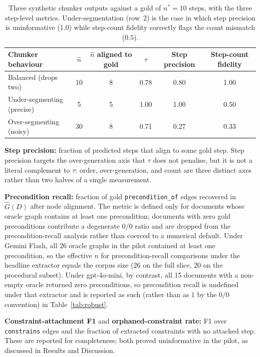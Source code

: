 \documentclass[make,article,submit,oneauthor,pdftex]{Definitions/mdpi}
\begin{document}
\begin{table}[ht]
\centering
\caption{Three synthetic chunker outputs against a gold of $n^{*}=10$
steps, with the three step-level metrics. Under-segmentation
(row~2) is the case in which step precision is uninformative ($1.0$)
while step-count fidelity correctly flags the count mismatch ($0.5$).}
\label{tab:metric-comparison}
\small
\begin{tabular}{lccccc}
\toprule
Chunker behaviour & $\hat{n}$ & $\hat{n}$ aligned to gold &
$\tau$ & Step precision & Step-count fidelity \\
\midrule
Balanced (drops two)        & 10 & 8 & 0.78 & 0.80 & 1.00 \\
Under-segmenting (precise)  &  5 & 5 & 1.00 & 1.00 & 0.50 \\
Over-segmenting (noisy)     & 30 & 8 & 0.71 & 0.27 & 0.33 \\
\bottomrule
\end{tabular}
\end{table}

\textbf{Step precision:} fraction of predicted steps that align to
some gold step. Step precision targets the over-generation axis that
$\tau$ does not penalise, but it is not a literal complement to
$\tau$: order, over-generation, and count are three distinct axes
rather than two halves of a single measurement.

\textbf{Precondition recall:} fraction of gold
\texttt{precondition\_of} edges recovered in $\hat{G}(D)$ after node
alignment. The metric is defined only for documents whose oracle graph
contains at least one precondition; documents with zero gold
preconditions contribute a degenerate $0/0$ ratio and are dropped from
the precondition-recall analysis rather than coerced to a numerical
default. Under Gemini Flash, all 26 oracle graphs in the pilot
contained at least one precondition, so the effective $n$ for
precondition-recall comparisons under the headline extractor equals
the corpus size (26 on the full slice, 20 on the procedural subset).
Under gpt-4o-mini, by contrast, all 15 documents with a non-empty
oracle returned zero preconditions, so precondition recall is
undefined under that extractor and is reported as such (rather than as
$1$ by the $0/0$ convention) in Table~\ref{tab:robust}.

\textbf{Constraint-attachment F1} and \textbf{orphaned-constraint
rate:} F1 over \texttt{constrains} edges and the fraction of extracted
constraints with no attached step. These are reported for
completeness; both proved uninformative in the pilot, as discussed in
Results and Discussion.
\end{document}
